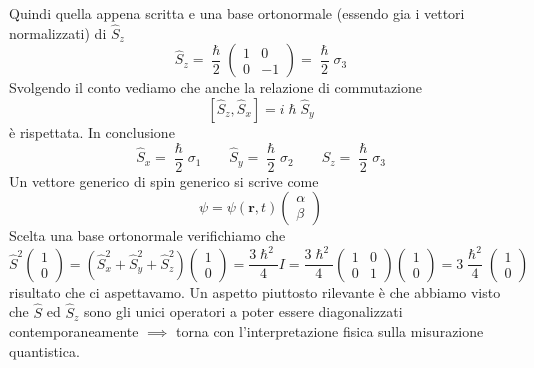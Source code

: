Quindi quella appena scritta e una base
ortonormale (essendo gia i vettori normalizzati) di \(\hat{S}_{z}\)
\[
    \hat{S}_{z} = \frac{\hslash}{2}
    \begin{pmatrix}
        1 & 0  \\
        0 & -1
    \end{pmatrix} = \frac{\hslash}{2} \sigma_{3}
\] Svolgendo il conto vediamo che anche la relazione di commutazione
\[
    [ \hat{S}_{z}, \hat{S}_{x}] = i \hslash \hat{S}_{y}
\]
è rispettata.
In conclusione
\[
    \hat{S}_{x} = \frac{\hslash}{2} \sigma_{1} \qquad
    \hat{S}_{y} =  \frac{\hslash}{2} \sigma_{2} \qquad
    \hat{S}_{z} = \frac{\hslash}{2} \sigma_{3}
\] Un vettore generico di spin generico si scrive come
\[
    \psi = \psi (\bm{r},t)
    \begin{pmatrix}
        \alpha \\
        \beta
    \end{pmatrix}
\]
Scelta una base ortonormale verifichiamo che
\[
    \hat{S}^{2}
    \begin{pmatrix}
        1 \\
        0
    \end{pmatrix}
    = (\hat{S}_{x}^{2} + \hat{S}_{y}^{2}+\hat{S}_{z}^{2})\begin{pmatrix}
                                                             1 \\
                                                             0
    \end{pmatrix} = \frac{3 \hslash^{2}}{4} I = \frac{3\hslash^{2}}{4} \begin{pmatrix}
                                                                           1 & 0 \\
                                                                           0 & 1
    \end{pmatrix}\begin{pmatrix}
                     1 \\
                     0
    \end{pmatrix}
    = 3 \frac{\hslash^{2}}{4} \begin{pmatrix}
                                  1 \\
                                  0
    \end{pmatrix}
\] risultato che ci aspettavamo.
Un aspetto piuttosto rilevante è che
abbiamo visto che \(\hat{S}\) ed \(\hat{S}_{z}\) sono gli unici
operatori a poter essere diagonalizzati contemporaneamente \(\implies\)
torna con l'interpretazione fisica sulla misurazione quantistica.
\bigskip

